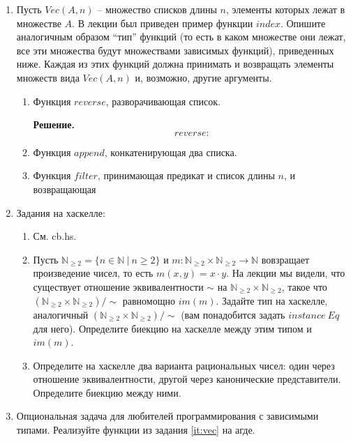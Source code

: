 \begin{enumerate}
\item \label{it:vec}
    Пусть $Vec(A,n)$ -- множество списков длины $n$, элементы которых лежат в множестве $A$.
    В лекции был приведен пример функции $index$.
    Опишите аналогичным образом ``тип'' функций (то есть в каком множестве они лежат, все эти множества будут множествами зависимых функций), приведенных ниже.
    Каждая из этих функций должна принимать и возвращать элементы множеств вида $Vec(A,n)$ и, возможно, другие аргументы.
\begin{enumerate}
\item Функция $reverse$, разворачивающая список.

\textbf{Решение.} $$reverse : $$
\item Функция $append$, конкатенирующая два списка.
\item Функция $filter$, принимающая предикат и список длины $n$, и возвращающая
\end{enumerate}

\item Задания на хаскелле:
\begin{enumerate}
\item См. cb.hs.
\item Пусть $\mathbb{N}_{\geq 2} = \{ n \in \mathbb{N}\ |\ n \geq 2 \}$ и $m : \mathbb{N}_{\geq 2} \times \mathbb{N}_{\geq 2} \to \mathbb{N}$ вовзращает произведение чисел, то есть $m(x,y) = x \cdot y$.
    На лекции мы видели, что существует отношение эквивалентности $\sim$ на $\mathbb{N}_{\geq 2} \times \mathbb{N}_{\geq 2}$, такое что $(\mathbb{N}_{\geq 2} \times \mathbb{N}_{\geq 2})/\!\!\sim$ равномощно $im(m)$.
    Задайте тип на хаскелле, аналогичный $(\mathbb{N}_{\geq 2} \times \mathbb{N}_{\geq 2})/\!\!\sim$ (вам понадобится задать $instance\ Eq$ для него).
    Определите биекцию на хаскелле между этим типом и $im(m)$.
\item
{
    Определите на хаскелле два варианта рациональных чисел: один через отношение эквивалентности, другой через канонические представители.
}
    Определите биекцию между ними.
\end{enumerate}

\item Опциональная задача для любителей программирования с зависимыми типами. Реализуйте функции из задания \ref{it:vec} на агде.

\end{enumerate}


